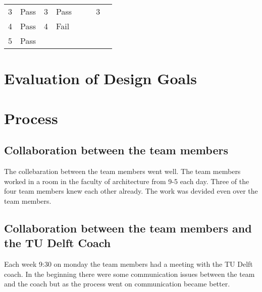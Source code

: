 \begin{table}[h]
\begin{tabular}{llllllll}
3                                                     & Pass                                                  & 3                                                       & Pass                                                  &                                                        &                                                       & 3                                                     &                                                       \\
4                                                     & Pass                                                  & 4                                                       & Fail                                                  &                                                        &                                                       &                                                       &                                                       \\
5                                                     & Pass                                                  &                                                         &                                                       &                                                        &                                                       &                                                       &                                                      
\end{tabular}
\end{table}

\section{Evaluation of Design Goals}

\section{Process}

\subsection{Collaboration between the team members}
The collebaration between the team members went well. The team members worked in a room in the faculty of architecture from 9-5 each day. Three of the four team members knew each other already. The work was devided even over the team members. 

\subsection{Collaboration between the team members and the TU Delft Coach}
Each week 9:30 on monday the team members had a meeting with the TU Delft coach. In the beginning there were some communication issues between the team and the coach but as the process went on communication became better.


